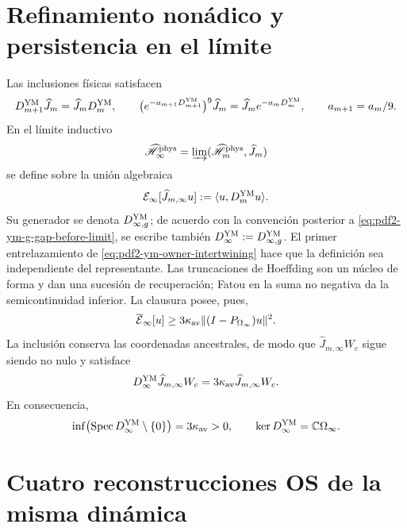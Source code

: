 \section{Refinamiento nonádico y persistencia en el límite}

Las inclusiones físicas satisfacen
\begin{equation}\label{eq:pdf2-ym-owner-intertwining}
 D_{m+1}^{\rm YM}\widehat J_m
 =\widehat J_mD_m^{\rm YM},\qquad
 \bigl(e^{-a_{m+1}D_{m+1}^{\rm YM}}\bigr)^9\widehat J_m
 =\widehat J_me^{-a_mD_m^{\rm YM}},\qquad a_{m+1}=a_m/9.
\end{equation}
En el límite inductivo
\begin{equation}\label{eq:pdf2-ym-owner-inductive-limit}
 \widehat{\mathscr H}_\infty^{\rm phys}
 =\varinjlim(\widehat{\mathscr H}_m^{\rm phys},\widehat J_m)
\end{equation}
se define sobre la unión algebraica
\begin{equation}\label{eq:pdf2-ym-owner-limit-form}
 \mathcal E_\infty[\widehat J_{m,\infty}u]
 :=\langle u,D_m^{\rm YM}u\rangle.
\end{equation}
Su generador se denota
$D_{\infty,g}^{\rm YM}$; de acuerdo con la convención posterior a
\eqref{eq:pdf2-ym-g-gap-before-limit}, se escribe también
$D_\infty^{\rm YM}:=D_{\infty,g}^{\rm YM}$.
El primer entrelazamiento de \eqref{eq:pdf2-ym-owner-intertwining} hace que la
definición sea independiente del representante. Las truncaciones de Hoeffding son
un núcleo de forma y dan una sucesión de recuperación; Fatou en la suma no negativa
da la semicontinuidad inferior. La clausura posee, pues,
\begin{equation}\label{eq:pdf2-ym-owner-limit-gap}
 \overline{\mathcal E}_\infty[u]
 \ge3\kappa_{\rm av}\|(I-P_{\Omega_\infty})u\|^2.
\end{equation}
La inclusión conserva las coordenadas ancestrales, de modo que
$\widehat J_{m,\infty}W_c$ sigue siendo no nulo y satisface
\begin{equation}\label{eq:pdf2-ym-owner-limit-witness}
 D_\infty^{\rm YM}\widehat J_{m,\infty}W_c
 =3\kappa_{\rm av}\widehat J_{m,\infty}W_c.
\end{equation}
En consecuencia,
\begin{equation}\label{eq:pdf2-ym-owner-exact-gap}
 \inf\bigl(\operatorname{Spec}D_\infty^{\rm YM}\setminus\{0\}\bigr)
 =3\kappa_{\rm av}>0,
 \qquad \ker D_\infty^{\rm YM}=\mathbb C\Omega_\infty.
\end{equation}

\section{Cuatro reconstrucciones OS de la misma dinámica}

